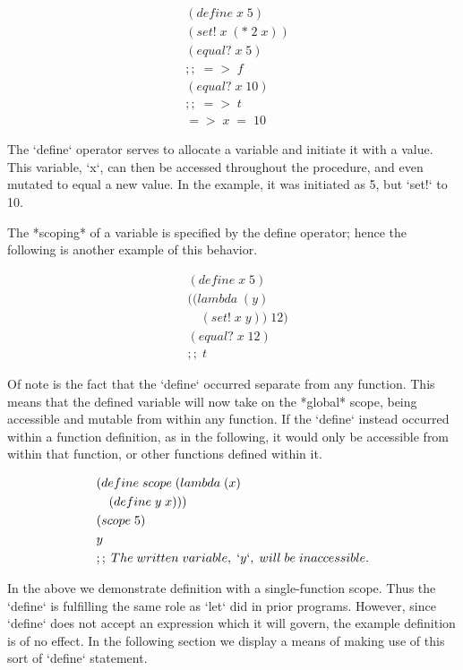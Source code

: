 \begin{align*}
& (define \; x \; 5)
\\& (set! \; x \; (* \; 2 \; x))
\\& (equal? \; x \; 5)
\\& ;; \; => \; f
\\& (equal? \; x \; 10)
\\& ;; \; => \; t
\\& => \; x \; = \; 10
\end{align*}

The `define` operator serves to allocate a variable and initiate it with a value. 
This variable, `x`, can then be accessed throughout the procedure, and even mutated 
to equal a new value. In the example, it was initiated as 5, but `set!` to 10.

The *scoping* of a variable is specified by the define operator; hence the following 
is another example of this behavior.

\begin{align*}
& (define \; x \; 5)
\\& ((lambda \; (y)
\\& \quad (set! \; x \; y)) \; 12)
\\& (equal? \; x \; 12) \; 
\\& ;; \; t
\end{align*}

Of note is the fact that the `define` occurred separate from any function. This 
means that the defined variable will now take on the *global* scope, being accessible 
and mutable from within any function. If the `define` instead occurred within a 
function definition, as in the following, it would only be accessible from within 
that function, or other functions defined within it.

\begin{align*}
& (define \; scope \; (lambda \; (x)
\\& \quad (define \; y \; x)))
\\& (scope \; 5)
\\& y
\\& ;; \; The \; written \; variable, \; `y`, \; will \; be \; inaccessible.
\end{align*}

In the above we demonstrate definition with a single-function scope. Thus the 
`define` is fulfilling the same role as `let` did in prior programs. However, since 
`define` does not accept an expression which it will govern, the example definition 
is of no effect. In the following section we display a means of making use of this 
sort of `define` statement.

